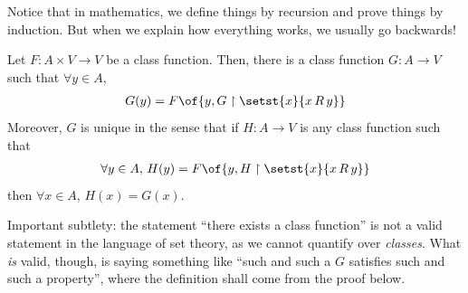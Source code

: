 Notice that in mathematics, we define things by recursion and prove things by induction. But when we explain how everything works, we usually go backwards!

\begin{boxtheorem}
    Let $F : A \times V \to V$ be a class function. Then, there is a class function $G : A \to V$ such that $\forall y \in A$,
    \begin{align*}
        G(y) = F\of{y, G \restriction \setst{x}{x \, R \, y}}
    \end{align*}
    Moreover, $G$ is unique in the sense that if $H : A \to V$ is any class function such that
    \begin{align*}
        \forall y \in A,\, H(y) = F\of{y, H \restriction \setst{x}{x \, R \, y}}
    \end{align*}
    then $\forall x \in A$, $H(x) = G(x)$.
\end{boxtheorem}
\begin{boxwarning}
    Important subtlety: the statement ``there exists a class function'' is not a valid statement in the language of set theory, as we cannot quantify over \textit{classes}. What \textit{is} valid, though, is saying something like ``such and such a $G$ satisfies such and such a property'', where the definition shall come from the proof below.
\end{boxwarning}
